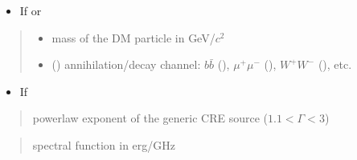 \documentclass[letterpaper,10pt,english]{sphinxmanual}
\begin{document}
\begin{fulllineitems}
\sphinxAtStartPar
{}

\begin{DUlineblock}{0em}
\item[] 
\end{DUlineblock}
\begin{itemize}
\item {} 
\sphinxAtStartPar
If  or 

\end{itemize}
\begin{quote}\begin{description}
\begin{itemize}
\item {} 
\sphinxAtStartPar
{} \textendash{} mass of the DM particle in GeV/\(c^2\)

\item {} 
\sphinxAtStartPar
{} () \textendash{} annihilation/decay channel: \(b\bar b\) (), \(\mu^+ \mu^-\) (), \(W^+ W^-\) (), etc.

\end{itemize}

\end{description}\end{quote}
\begin{itemize}
\item {} 
\sphinxAtStartPar
If 

\end{itemize}
\begin{quote}\begin{description}
\sphinxAtStartPar
{} \textendash{} power\sphinxhyphen{}law exponent of the generic CRE source (\(1.1 < \Gamma < 3\))

\end{description}\end{quote}

\begin{DUlineblock}{0em}
\item[] 
\end{DUlineblock}
\begin{quote}\begin{description}
\sphinxAtStartPar
spectral function in erg/GHz

\end{description}\end{quote}

\end{fulllineitems}
\end{document}
